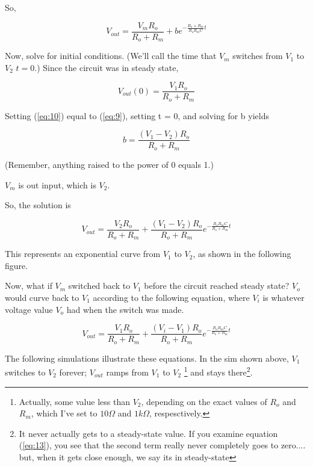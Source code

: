 \documentclass[12pt]{article}
\begin{document}
So, 

\begin{equation} \label{eq:9}
V_{out} = \frac{V_{m}R_{o}}{R_{o}+R_{m}} + be^{-\frac{R_{o} + R_{m}}{R_{o}R_{m}C}t}
\end{equation}

Now, solve for initial conditions. (We'll call the time that $V_{m}$ switches from $V_{1}$ to $V_{2}$ $t=0$.) Since the circuit was in steady state,

\begin{equation} \label{eq:10}
V_{out}(0) = \frac{V_{1}R_{o}}{R_{o}+R_{m}}
\end{equation}

Setting (\ref{eq:10}) equal to (\ref{eq:9}), setting t = 0, and solving for b yields

\begin{equation} \label{eq:11}
b = \frac{(V_{1} - V_{2})R_{o}}{R_{o} + R_{m}}
\end{equation}

(Remember, anything raised to the power of 0 equals 1.)

$V_{m}$ is out input, which is $V_{2}$.

So, the solution is

\begin{equation} \label{eq:12}
V_{out} = \frac{V_{2}R_{o}}{R_{o}+R_{m}} + \frac{(V_{1} - V_{2})R_{o}}{R_{o} + R_{m}}e^{-\frac{R_{o}R_{m}C}{R_{o} + R_{m}}t}
\end{equation}

This represents an exponential curve from $V_{1}$ to $V_{2}$, as shown in the following figure.


Now, what if $V_{m}$ switched back to $V_{1}$ before the circuit reached steady state? $V_{o}$ would curve back to $V_{1}$ according to the following equation, where $V_{i}$ is whatever voltage value $V_{o}$ had when the switch was made.

\begin{equation} \label{eq:13}
V_{out} = \frac{V_{1}R_{o}}{R_{o}+R_{m}} + \frac{(V_{i} - V_{1})R_{o}}{R_{o} + R_{m}}e^{-\frac{R_{o}R_{m}C}{R_{o} + R_{m}}t}
\end{equation}

The following simulations illustrate these equations. In the sim shown above, $V_{1}$ switches to $V_{2}$ forever; $V_{out}$ ramps from $V_{1}$ to $V_{2}$ \footnote{Actually, some value less than $V_{2}$, depending on the exact values of $R_{o}$ and $R_{m}$, which I've set to $10\Omega$ and $1k\Omega$, respesctively.} and stays there\footnote{It never actually gets to a steady-state value. If you examine equation (\ref{eq:13}), you see that the second term really never completely goes to zero.... but, when it gets close enough, we say its in steady-state}. 
\end{document}
